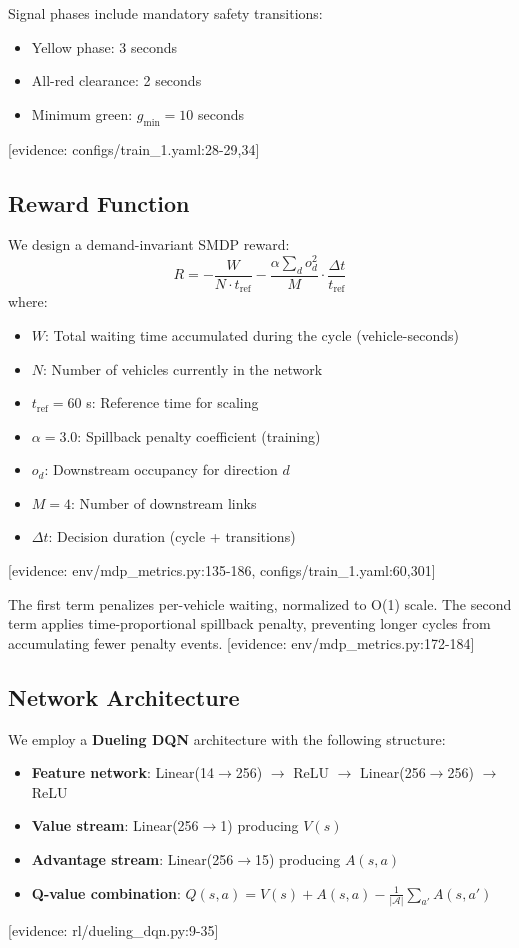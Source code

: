 Signal phases include mandatory safety transitions:
\begin{itemize}
    \item Yellow phase: 3 seconds
    \item All-red clearance: 2 seconds
    \item Minimum green: $g_{\min} = 10$ seconds
\end{itemize}
[evidence: configs/train\_1.yaml:28-29,34]

\subsection{Reward Function}

We design a demand-invariant SMDP reward:
\begin{equation}
R = -\frac{W}{N \cdot t_{\text{ref}}} - \frac{\alpha \sum_d o_d^2}{M} \cdot \frac{\Delta t}{t_{\text{ref}}}
\end{equation}
where:
\begin{itemize}
    \item $W$: Total waiting time accumulated during the cycle (vehicle-seconds)
    \item $N$: Number of vehicles currently in the network
    \item $t_{\text{ref}} = 60$ s: Reference time for scaling
    \item $\alpha = 3.0$: Spillback penalty coefficient (training)
    \item $o_d$: Downstream occupancy for direction $d$
    \item $M = 4$: Number of downstream links
    \item $\Delta t$: Decision duration (cycle + transitions)
\end{itemize}
[evidence: env/mdp\_metrics.py:135-186, configs/train\_1.yaml:60,301]

The first term penalizes per-vehicle waiting, normalized to O(1) scale. The second term applies time-proportional spillback penalty, preventing longer cycles from accumulating fewer penalty events.
[evidence: env/mdp\_metrics.py:172-184]

\subsection{Network Architecture}

We employ a \textbf{Dueling DQN} architecture with the following structure:
\begin{itemize}
    \item \textbf{Feature network}: Linear(14$\to$256) $\to$ ReLU $\to$ Linear(256$\to$256) $\to$ ReLU
    \item \textbf{Value stream}: Linear(256$\to$1) producing $V(s)$
    \item \textbf{Advantage stream}: Linear(256$\to$15) producing $A(s,a)$
    \item \textbf{Q-value combination}: $Q(s,a) = V(s) + A(s,a) - \frac{1}{|\mathcal{A}|}\sum_{a'} A(s,a')$
\end{itemize}
[evidence: rl/dueling\_dqn.py:9-35]

